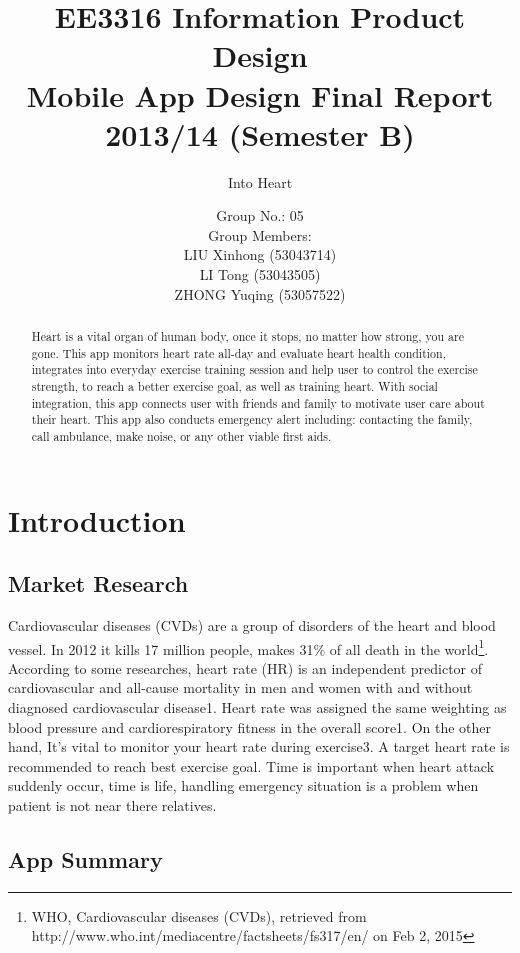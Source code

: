 \documentclass[10pt,a4paper,final]{scrartcl}
\author{
Group No.: 05 \\ 
Group Members: \\
LIU Xinhong (53043714) \\
LI Tong (53043505) \\
ZHONG Yuqing (53057522)
}
\title{
EE3316 Information Product Design \\ Mobile App Design Final Report \\ 2013/14 (Semester B)}
\subtitle{Into Heart}
\begin{document}
\maketitle

\pagebreak

\begin{abstract}
Heart is a vital organ of human body, once it stops, no matter how strong, you are gone.  
This app monitors heart rate all-day and evaluate heart health condition, integrates into everyday exercise training session and help user to control the exercise strength, to reach a better exercise goal, as well as training heart. With social integration, this app connects user with friends and family to motivate user care about their heart. This app also conducts emergency alert including: contacting the family, call ambulance, make noise, or any other viable first aids. 
\end{abstract}



\tableofcontents

\section{Introduction}

\subsection{Market Research}

Cardiovascular diseases (CVDs) are a group of disorders of the heart and blood vessel. In 2012 it kills 17 million people, makes 31\% of all death in the world\footnote{WHO, Cardiovascular diseases (CVDs), retrieved from http://www.who.int/mediacentre/factsheets/fs317/en/ on Feb 2, 2015 }. 
According to some researches, heart rate (HR) is an independent predictor of cardiovascular and all-cause mortality in men and women with and without diagnosed cardiovascular disease1. Heart rate was assigned the same weighting as blood pressure and cardiorespiratory fitness in the overall score1. On the other hand, It's vital to monitor your heart rate during exercise3. A target heart rate is recommended to reach best exercise goal. Time is important when heart attack suddenly occur, time is life, handling emergency situation is a problem when patient is not near there relatives. 

\subsection{App Summary}
\end{document}
